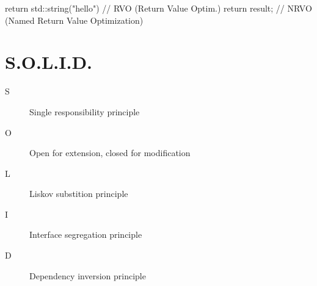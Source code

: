 \documentclass{article}
\begin{document}
\begin{multicols*}{4}
\begin{cppcode}
return std::string("hello") // RVO (Return Value Optim.)
return result; // NRVO (Named Return Value Optimization)
\end{cppcode}

\section*{S.O.L.I.D.}
\begin{description}
    \item[S] Single responsibility principle
    \item[O] Open for extension, closed for modification
    \item[L] Liskov substition principle
    \item[I] Interface segregation principle
    \item[D] Dependency inversion principle
\end{description}

\end{multicols*}
\end{document}
